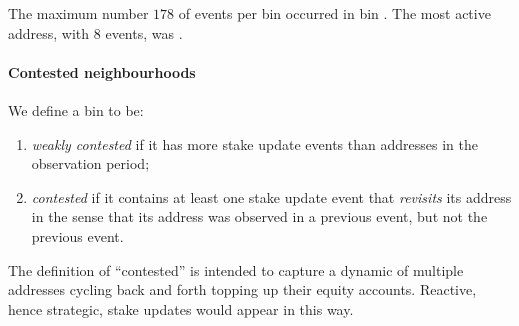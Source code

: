 The maximum number $178$ of events per bin occurred in bin .
%
The most active address, with $8$ events, was .

\paragraph{Contested neighbourhoods}
We define a bin to be:
\begin{enumerate}
  \item \emph{weakly contested} if it has more stake update events than addresses in the observation period;
  \item \emph{contested} if it contains at least one stake update event that \emph{revisits} its address in the sense that its address was observed in a previous event, but not the previous event.
\end{enumerate}
The definition of ``contested'' is intended to capture a dynamic of multiple addresses cycling back and forth topping up their equity accounts.
%
Reactive, hence strategic, stake updates would appear in this way.

